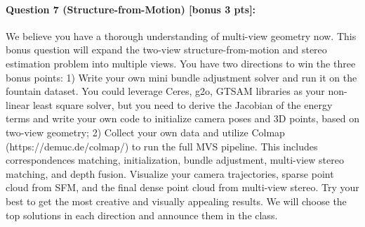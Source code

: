 \documentclass[11pt]{article}
\begin{document}

\paragraph{Question 7 (Structure-from-Motion) [bonus 3 pts]:}
We believe you have a thorough understanding of multi-view geometry now. This bonus question will expand the two-view structure-from-motion and stereo estimation problem into multiple views. You have two directions to win the three bonus points: 1) Write your own mini bundle adjustment solver and run it on the fountain dataset. You could leverage Ceres, g2o, GTSAM libraries as your non-linear least square solver, but you need to derive the Jacobian of the energy terms and write your own code to initialize camera poses and 3D points, based on two-view geometry; 2) Collect your own data and utilize Colmap (https://demuc.de/colmap/) to run the full MVS pipeline. This includes correspondences matching, initialization, bundle adjustment, multi-view stereo matching, and depth fusion. Visualize your camera trajectories, sparse point cloud from SFM, and the final dense point cloud from multi-view stereo. Try your best to get the most creative and visually appealing results. We will choose the top solutions in each direction and announce them in the class. 
\end{document}
